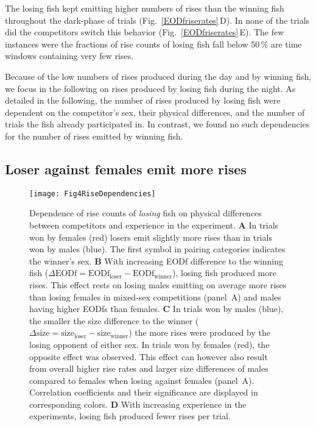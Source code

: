 \documentclass[vruler,JEB]{COB}%
\newcommand{\figitem}[1]{\textsf{\bfseries\uppercase{#1}}\penalty10000 }
\newcommand{\panel}[1]{\textsf{#1}}
\newcommand{\subfref}[2]{\textup{\ref{#1}}\,\panel{#2}}
\newcommand{\Figb}{Fig.}
\newcommand{\Subfigrefb}[2]{\Figb~\subfref{#1}{#2}}
\begin{document}
The losing fish kept emitting higher numbers of rises than the winning fish throughout the dark-phase of trials (\Subfigrefb{EODfriserates}{D}). In none of the trials did the competitors switch this behavior  (\Subfigrefb{EODfriserates}{E}). The few instances were the fractions of rise counts of losing fish fall below 50\,\% are time windows containing very few rises.

Because of the low numbers of rises produced during the day and by winning fish, we focus in the following on rises produced by losing fish during the night. As detailed in the following, the number of rises produced by losing fish were dependent on the competitor's sex, their physical differences, and the number of trials the fish already participated in. In contrast, we found no such dependencies for the number of rises emitted by winning fish.
 
\subsection{Loser against females emit more rises}

\begin{figure*}[!h]
\centerline{\texttt{[image: Fig4RiseDependencies]}}
\caption{Dependence of rise counts of \emph{losing} fish on physical differences between competitors and experience in the experiment. \figitem{A} In trials won by females (red) losers emit slightly more rises than in trials won by males (blue). The first symbol in pairing categories indicates the winner's sex. \figitem{B} With increasing EODf difference to the winning fish ($\Delta\text{EODf} = \text{EODf}_{\text{loser}} - \text{EODf}_{\text{winner}}$), losing fish produced more rises. This effect rests on losing males emitting on average more rises than losing females in mixed-sex competitions (panel~\panel{A}) and males having higher EODfs than females. \figitem{C} In trials won by males (blue), the smaller the size difference to the winner ($\Delta\text{size} = \text{size}_{\text{loser}} - \text{size}_{\text{winner}}$) the more rises were produced by the losing opponent of either sex. In trials won by females (red), the opposite effect was observed. This effect can however also result from overall higher rise rates and larger size differences of males compared to females when losing against females (panel~\panel{A}). Correlation coefficients and their significance are displayed in corresponding colors. \figitem{D} With increasing experience in the experiments, losing fish produced fewer rises per trial.}
\label{risefactors}
\end{figure*}
\end{document}
